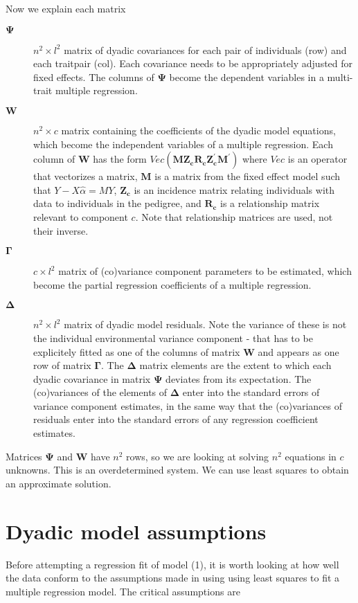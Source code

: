 \documentclass[titlepage]{article}  %
\begin{document}
Now we explain each matrix 
\begin{description}
\item[$\bm{\Psi}$] $n^{2} \times l^{2}$ matrix of dyadic covariances for each pair of individuals (row) and each traitpair (col). Each covariance needs to be appropriately adjusted for fixed effects. The columns of $\bm{\Psi}$ become the dependent variables in a multi-trait multiple regression.
\item[$\bm{W}$] $n^{2} \times c$ matrix containing the coefficients of the dyadic model equations, which become the independent variables of a multiple regression. Each column of $\bm{W}$ has the form $Vec{\bm{(MZ_{c} R_{c} Z_{c}^{\prime}M^{\prime})}}$ where $Vec$ is an operator that vectorizes a matrix, $\bm{M}$ is a matrix from the fixed effect model such that \mbox{\boldmath $Y - X \hat{\alpha} = M Y$}, $\bm{Z_{c}}$ is an incidence matrix relating individuals with data to individuals in the pedigree, and $\bm{R_{c}}$ is a relationship matrix relevant to component $c$. Note that relationship matrices are used, not their inverse.
\item[$\bm{\Gamma}$] $c \times l^{2}$ matrix of (co)variance component parameters to be estimated, which become the partial regression coefficients of a multiple regression.
\item[$\bm{\Delta}$] $n^{2} \times l^{2}$ matrix of dyadic model residuals. Note the variance of these is not the individual environmental variance component - that has to be explicitely fitted as one of the columns of matrix $\bm{W}$ and appears as one row of matrix $\bm{\Gamma}$. The $\bm{\Delta}$ matrix elements are the extent to which each dyadic covariance in matrix $\bm{\Psi}$ deviates from its expectation. The (co)variances of the elements of $\bm{\Delta}$ enter into the standard errors of variance component estimates, in the same way that the (co)variances of residuals enter into the standard errors of any regression coefficient estimates. 
\end{description}

Matrices $\bm{\Psi}$ and $\bm{W}$ have $n^{2}$ rows, so we are looking at solving $n^{2}$ equations in $c$ unknowns. This is an overdetermined system. We can use least squares to obtain an approximate solution. 

\section{Dyadic model assumptions}
Before attempting a regression fit of model (1), it is worth looking at how well the data conform to the assumptions made in using using least squares to fit a multiple regression model. The critical assumptions are
\end{document}
